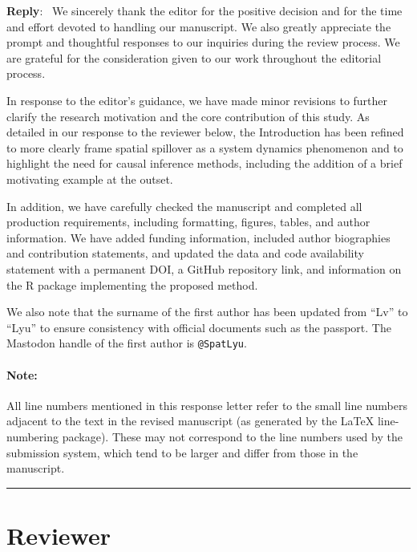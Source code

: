 \documentclass[11pt]{article}
\newcounter{reviewer}
\newenvironment{reply}
   {\medskip \noindent \color{blue} \begin{sf}\textbf{Reply}:\  }
   {\medskip \par \end{sf}}
\newcommand{\skipreviewer}{\stepcounter{reviewer}}
\newcommand{\reviewersection}{\stepcounter{reviewer} \bigskip \hrule
                  \section*{Reviewer \thereviewer}}
\begin{document}
\begin{reply}
We sincerely thank the editor for the positive decision and for the time and effort devoted to handling our manuscript. We also greatly appreciate the prompt and thoughtful responses to our inquiries during the review process. We are grateful for the consideration given to our work throughout the editorial process.

In response to the editor's guidance, we have made minor revisions to further clarify the research motivation and the core contribution of this study. As detailed in our response to the reviewer below, the Introduction has been refined to more clearly frame spatial spillover as a system dynamics phenomenon and to highlight the need for causal inference methods, including the addition of a brief motivating example at the outset.

In addition, we have carefully checked the manuscript and completed all production requirements, including formatting, figures, tables, and author information. We have added funding information, included author biographies and contribution statements, and updated the data and code availability statement with a permanent DOI, a GitHub repository link, and information on the R package implementing the proposed method.

We also note that the surname of the first author has been updated from “Lv” to “Lyu” to ensure consistency with official documents such as the passport. The Mastodon handle of the first author is \texttt{@SpatLyu}.
\end{reply}

\paragraph{Note:} All line numbers mentioned in this response letter refer to the small line numbers adjacent to the text in the revised manuscript (as generated by the \LaTeX{} line-numbering package). These may not correspond to the line numbers used by the submission system, which tend to be larger and differ from those in the manuscript.


\reviewersection
\end{document}
